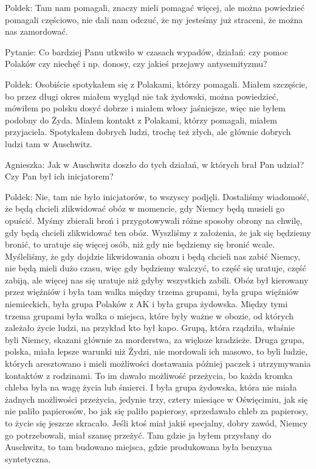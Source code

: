 Poldek: Tam nam pomagali, znaczy mieli pomagać więcej, ale można powiedzieć pomagali częściowo, nie dali nam odczuć, że my jesteśmy już straceni, że można nas zamordować. 

Pytanie: Co bardziej Panu utkwiło w czasach wypadów, działań: czy pomoc Polaków czy niechęć i np. donosy, czy jakieś przejawy antysemityzmu? 

Poldek: Osobiście spotykałem się z Polakami, którzy pomagali. Miałem szczęście, bo przez długi okres miałem wygląd nie tak żydowski, można powiedzieć, mówiłem po polsku dosyć dobrze i miałem włosy jaśniejsze, więc nie byłem podobny do Żyda. Miałem kontakt z Polakami, którzy pomagali, miałem przyjaciela. Spotykałem dobrych ludzi, trochę też złych, ale głównie dobrych ludzi tam w Auschwitz. 

Agnieszka: Jak w Auschwitz doszło do tych działań, w których brał Pan udział? Czy Pan był ich inicjatorem?  

Poldek: Nie, tam nie było inicjatorów, to wszyscy podjęli. Dostaliśmy wiadomość, że będą chcieli zlikwidować obóz w momencie, gdy Niemcy będą musieli go opuścić. Myśmy zbierali broń i przygotowywali różne sposoby obrony na chwilę, gdy będą chcieli zlikwidować ten obóz. Wyszliśmy z założenia, że jak się będziemy bronić, to uratuje się więcej osób, niż gdy nie będziemy się bronić wcale. Myśleliśmy, że gdy dojdzie likwidowania obozu i będą chcieli nas zabić Niemcy, nie będą mieli dużo czasu, więc gdy będziemy walczyć, to część się uratuje, część zabiją, ale więcej nas się uratuje niż gdyby wszystkich zabili. Obóz był kierowany przez więźniów i była tam walka między trzema grupami, była grupa więźniów niemieckich, była grupa Polaków z AK i była grupa żydowska. Między tymi trzema grupami była walka o miejsca, które były ważne w obozie, od których zależało życie ludzi, na przykład kto był kapo. Grupą, która rządziła, właśnie byli Niemcy, skazani głównie za morderstwa, za większe kradzieże. Druga grupa, polska, miała lepsze warunki niż Żydzi, nie mordowali ich masowo, to byli ludzie, których aresztowano i mieli możliwości dostawania później paczek i utrzymywania kontaktów z rodzinami. To im dawało możliwość przeżycia, bo każda kromka chleba była na wagę życia lub śmierci. I była grupa żydowska, która nie miała żadnych możliwości przeżycia, jedynie trzy, cztery miesiące w Oświęcimiu, jak się nie paliło papierosów, bo jak się paliło papierosy, sprzedawało chleb za papierosy, to życie się jeszcze skracało. Jeśli ktoś miał jakiś specjalny, dobry zawód, Niemcy go potrzebowali, miał szansę przeżyć. Tam gdzie ja byłem przysłany do Auschwitz, to tam budowano miejsca, gdzie produkowana była benzyna syntetyczna. 

